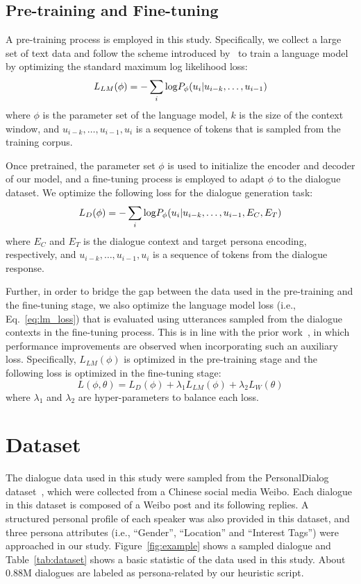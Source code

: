 \documentclass[letterpaper]{article}
\newcommand{\citep}{\cite}
\begin{document}
\subsection{Pre-training and Fine-tuning}
A pre-training process is employed in this study. Specifically, we collect a large set of text data and follow the scheme introduced by~\citep{radford2018improving} to train a language model by optimizing the standard maximum log likelihood loss:
\begin{equation}\label{eq:lm_loss}
    L_{LM}(\phi) = -\sum_i {\rm log}P_\phi(u_i | u_{i-k}, \dots, u_{i-1})
\end{equation}
where $\phi$ is the parameter set of the language model, $k$ is the size of the context window, and $u_{i-k}, \dots, u_{i-1}, u_i$ is a sequence of tokens that is sampled from the training corpus.

Once pretrained, the parameter set $\phi$ is used to initialize the encoder and decoder of our model, and a fine-tuning process is employed to adapt $\phi$ to the dialogue dataset. We optimize the following loss for the dialogue generation task:
\begin{equation}
    L_{D}(\phi) = -\sum_i {\rm log}P_\phi(u_i | u_{i-k}, \dots, u_{i-1}, E_C, E_T)
\end{equation}
where $E_C$ and $E_T$ is the dialogue context and target persona encoding, respectively, and $u_{i-k}, \dots, u_{i-1}, u_i$ is a sequence of tokens from the dialogue response.

Further, in order to bridge the gap between the data used in the pre-training and the fine-tuning stage, we also optimize the language model loss (i.e., Eq.~\ref{eq:lm_loss}) that is evaluated using utterances sampled from the dialogue contexts in the fine-tuning process. This is in line with the prior work~\citep{radford2018improving}, in which performance improvements are observed when incorporating such an auxiliary loss.
Specifically, $L_{LM}(\phi)$ is optimized in the pre-training stage and the following loss is optimized in the fine-tuning stage:
\begin{equation}\label{eq:total_loss}
    L(\phi, \theta) = L_{D}(\phi) + \lambda_1 L_{LM}(\phi) + \lambda_2 L_{W}(\theta)
\end{equation}
where $\lambda_1$ and $\lambda_2$ are hyper-parameters to balance each loss.

\section{Dataset}
The dialogue data used in this study were sampled from the PersonalDialog dataset~\citep{zheng2019Personal}, which were collected from a Chinese social media Weibo. Each dialogue in this dataset is composed of a Weibo post and its following replies. A structured personal profile of each speaker was also provided in this dataset, and three persona attributes (i.e., ``Gender'', ``Location'' and ``Interest Tags'') were approached in our study. Figure~\ref{fig:example} shows a sampled dialogue and Table~\ref{tab:dataset} shows a basic statistic of the data used in this study. About 0.88M dialogues are labeled as persona-related by our heuristic script.
\end{document}
